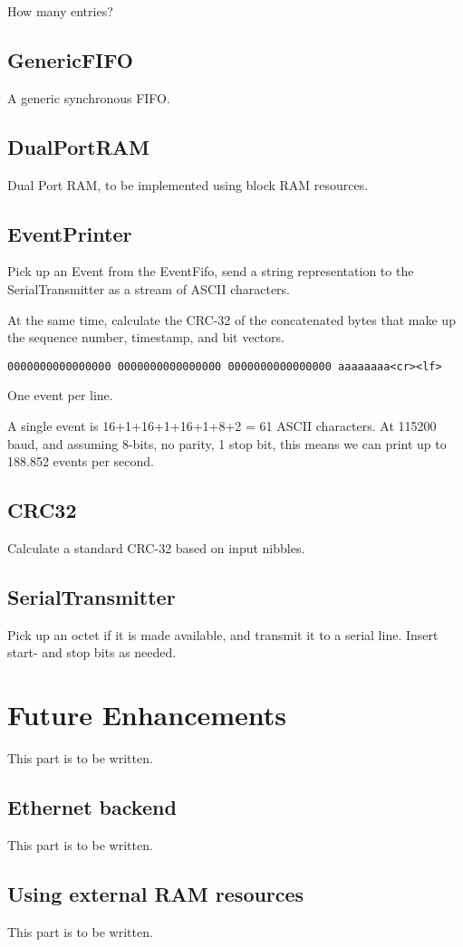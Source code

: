 \documentclass[a4paper,twoside]{report}
\begin{document}
How many entries?


\section{GenericFIFO}

A generic synchronous FIFO.

\section{DualPortRAM}

Dual Port RAM, to be implemented using block RAM resources.

\section{EventPrinter}

Pick up an Event from the EventFifo, send a string representation to the SerialTransmitter as a stream of ASCII characters.

At the same time, calculate the CRC-32 of the concatenated bytes that make up the sequence number, timestamp, and bit vectors.

{\small
\begin{verbatim}
0000000000000000 0000000000000000 0000000000000000 aaaaaaaa<cr><lf>
\end{verbatim}
}

One event per line.

A single event is 16+1+16+1+16+1+8+2 = 61 ASCII characters.
At 115200 baud, and assuming 8-bits, no parity, 1 stop bit, this means we can print up to 188.852 events per second.

\section{CRC32}

Calculate a standard CRC-32 based on input nibbles.

\section{SerialTransmitter}

Pick up an octet if it is made available, and transmit it to a serial line. Insert start- and stop bits as needed.

\chapter{Future Enhancements}

This part is to be written.

\section{Ethernet backend}

This part is to be written.

\section{Using external RAM resources}

This part is to be written.
\end{document}
